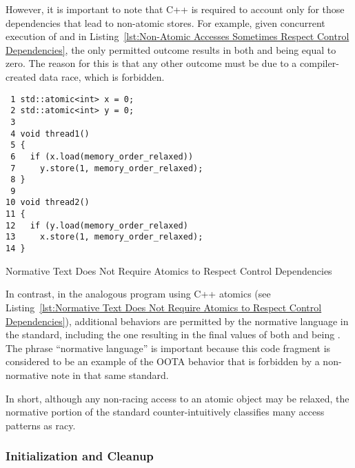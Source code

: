 \documentclass[10]{article}
\begin{document}
However, it is important to note that C++ is required to account only
for those dependencies that lead to non-atomic stores.
For example, given concurrent execution of  and
 in
Listing~\ref{lst:Non-Atomic Accesses Sometimes Respect Control Dependencies},
the only permitted outcome results in both  and  being
equal to zero.
The reason for this is that any other outcome must be due to a
compiler-created data race, which is forbidden.

\begin{listing}[tbp]
\begin{verbatim}
 1 std::atomic<int> x = 0;
 2 std::atomic<int> y = 0;
 3
 4 void thread1()
 5 {
 6   if (x.load(memory_order_relaxed))
 7     y.store(1, memory_order_relaxed);
 8 }
 9
10 void thread2()
11 {
12   if (y.load(memory_order_relaxed)
13     x.store(1, memory_order_relaxed);
14 }
\end{verbatim}
\caption{Normative Text Does Not Require Atomics to Respect Control Dependencies}
\label{lst:Normative Text Does Not Require Atomics to Respect Control Dependencies}
\end{listing}

In contrast, in the analogous program using C++ atomics
(see Listing~\ref{lst:Normative Text Does Not Require Atomics to Respect Control Dependencies}),
additional behaviors are permitted by the normative language in the
standard, including the one resulting in the final values of both 
and  being .
The phrase ``normative language'' is important because this code fragment
is considered to be an example of the OOTA behavior that is forbidden
by a non-normative note in that same standard.

In short, although any non-racing access to an atomic object may be
relaxed, the normative portion of the standard counter-intuitively
classifies many access patterns as racy.


\subsubsection{Initialization and Cleanup}
\label{sec:Initialization and Cleanup}
\end{document}
